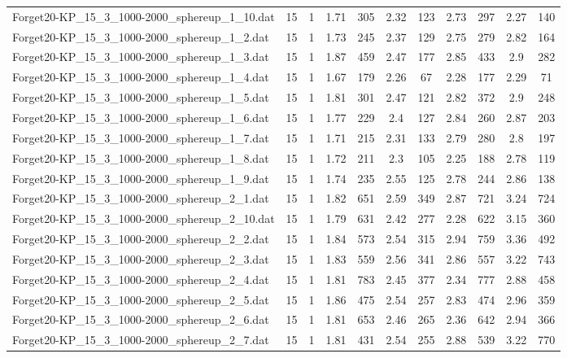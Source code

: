 \begin{table}[!ht]
\begin{tabular}{lcccccccccc}
Forget20-KP\_15\_3\_1000-2000\_sphereup\_1\_10.dat & 15 & 1 & 1.71 & 305 & 2.32 & 123 & 2.73 & 297 & 2.27 & 140 \\
Forget20-KP\_15\_3\_1000-2000\_sphereup\_1\_2.dat & 15 & 1 & 1.73 & 245 & 2.37 & 129 & 2.75 & 279 & 2.82 & 164 \\
Forget20-KP\_15\_3\_1000-2000\_sphereup\_1\_3.dat & 15 & 1 & 1.87 & 459 & 2.47 & 177 & 2.85 & 433 & 2.9 & 282 \\
Forget20-KP\_15\_3\_1000-2000\_sphereup\_1\_4.dat & 15 & 1 & 1.67 & 179 & 2.26 & 67 & 2.28 & 177 & 2.29 & 71 \\
Forget20-KP\_15\_3\_1000-2000\_sphereup\_1\_5.dat & 15 & 1 & 1.81 & 301 & 2.47 & 121 & 2.82 & 372 & 2.9 & 248 \\
Forget20-KP\_15\_3\_1000-2000\_sphereup\_1\_6.dat & 15 & 1 & 1.77 & 229 & 2.4 & 127 & 2.84 & 260 & 2.87 & 203 \\
Forget20-KP\_15\_3\_1000-2000\_sphereup\_1\_7.dat & 15 & 1 & 1.71 & 215 & 2.31 & 133 & 2.79 & 280 & 2.8 & 197 \\
Forget20-KP\_15\_3\_1000-2000\_sphereup\_1\_8.dat & 15 & 1 & 1.72 & 211 & 2.3 & 105 & 2.25 & 188 & 2.78 & 119 \\
Forget20-KP\_15\_3\_1000-2000\_sphereup\_1\_9.dat & 15 & 1 & 1.74 & 235 & 2.55 & 125 & 2.78 & 244 & 2.86 & 138 \\
Forget20-KP\_15\_3\_1000-2000\_sphereup\_2\_1.dat & 15 & 1 & 1.82 & 651 & 2.59 & 349 & 2.87 & 721 & 3.24 & 724 \\
Forget20-KP\_15\_3\_1000-2000\_sphereup\_2\_10.dat & 15 & 1 & 1.79 & 631 & 2.42 & 277 & 2.28 & 622 & 3.15 & 360 \\
Forget20-KP\_15\_3\_1000-2000\_sphereup\_2\_2.dat & 15 & 1 & 1.84 & 573 & 2.54 & 315 & 2.94 & 759 & 3.36 & 492 \\
Forget20-KP\_15\_3\_1000-2000\_sphereup\_2\_3.dat & 15 & 1 & 1.83 & 559 & 2.56 & 341 & 2.86 & 557 & 3.22 & 743 \\
Forget20-KP\_15\_3\_1000-2000\_sphereup\_2\_4.dat & 15 & 1 & 1.81 & 783 & 2.45 & 377 & 2.34 & 777 & 2.88 & 458 \\
Forget20-KP\_15\_3\_1000-2000\_sphereup\_2\_5.dat & 15 & 1 & 1.86 & 475 & 2.54 & 257 & 2.83 & 474 & 2.96 & 359 \\
Forget20-KP\_15\_3\_1000-2000\_sphereup\_2\_6.dat & 15 & 1 & 1.81 & 653 & 2.46 & 265 & 2.36 & 642 & 2.94 & 366 \\
Forget20-KP\_15\_3\_1000-2000\_sphereup\_2\_7.dat & 15 & 1 & 1.81 & 431 & 2.54 & 255 & 2.88 & 539 & 3.22 & 770 \\

\end{tabular}
\end{table}

